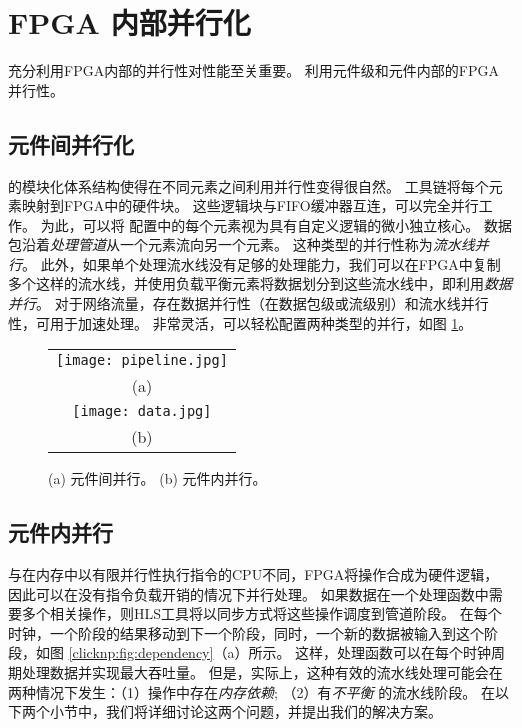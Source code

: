 \section{FPGA 内部并行化}
\label{clicknp:sec:optimization}

充分利用FPGA内部的并行性对性能至关重要。
\name 利用元件级和元件内部的FPGA并行性。

\subsection{元件间并行化}
\name 的模块化体系结构使得在不同元素之间利用并行性变得很自然。
\name 工具链将每个元素映射到FPGA中的硬件块。
这些逻辑块与FIFO缓冲器互连，可以完全并行工作。
为此，可以将 \name 配置中的每个元素视为具有自定义逻辑的微小独立核心。
数据包沿着\textit {处理管道}从一个元素流向另一个元素。
这种类型的并行性称为\textit {流水线并行}。
此外，如果单个处理流水线没有足够的处理能力，我们可以在FPGA中复制多个这样的流水线，并使用负载平衡元素将数据划分到这些流水线中，即利用\textit{数据并行}。
对于网络流量，存在数据并行性（在数据包级或流级别）和流水线并行性，可用于加速处理。
\name 非常灵活，可以轻松配置两种类型的并行，如图 \ref{clicknp:fig:element-para}。

\begin{figure}
\centering
\begin{tabular}{c}
\texttt{[image: pipeline.jpg]}\\
(a)\\
\texttt{[image: data.jpg]}\\
(b)\\
\end{tabular}
\caption{(a) 元件间并行。 (b) 元件内并行。}
\label{clicknp:fig:element-para}
\end{figure}

\subsection{元件内并行}
\label{clicknp:subsec:paral_in_elem}

与在内存中以有限并行性执行指令的CPU不同，FPGA将操作合成为硬件逻辑，因此可以在没有指令负载开销的情况下并行处理。
如果数据在一个处理函数中需要多个相关操作，则HLS工具将以同步方式将这些操作调度到管道阶段。
在每个时钟，一个阶段的结果移动到下一个阶段，同时，一个新的数据被输入到这个阶段，如图 \ref{clicknp:fig:dependency}（a）所示。
这样，处理函数可以在每个时钟周期处理数据并实现最大吞吐量。
但是，实际上，这种有效的流水线处理可能会在两种情况下发生：（1）操作中存在\textit {内存依赖}; （2）有\textit {不平衡} 的流水线阶段。
在以下两个小节中，我们将详细讨论这两个问题，并提出我们的解决方案。




